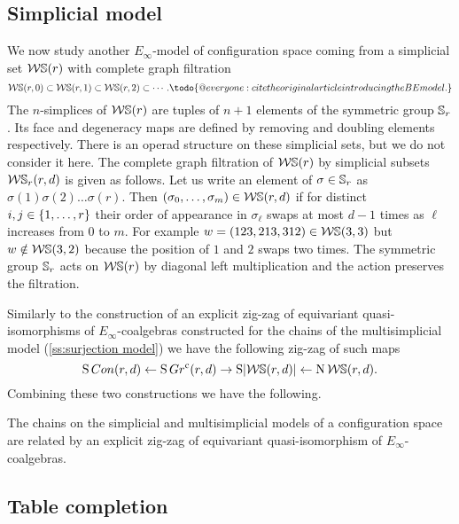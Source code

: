 \subsection{Simplicial model}\label{ss:simplicial model}

We now study another $E_\infty$-model of configuration space coming from a simplicial set $\mathcal{W}\mathbb{S}(r)$ with complete graph filtration
\[
\cW\sym(r,0) \subset \cW\sym(r,1) \subset \cW\sym(r,2) \subset \dotsb . \todo{@everyone: cite the original article introducing the BE model.}
\]
The $n$-simplices of $\mathcal{W}\mathbb{S}(r)$ are tuples of $n+1$ elements of the symmetric group $\mathbb{S}_r$.
Its face and degeneracy maps are defined by removing and doubling elements respectively.
There is an operad structure on these simplicial sets, but we do not consider it here.
The complete graph filtration of $\mathcal{W}\mathbb{S}(r)$ by simplicial subsets $\mathcal{W}\mathbb{S}_r(r,d)$ is given as follows.
Let us write an element of $\sigma \in \mathbb{S}_r$ as $\sigma(1) \sigma(2) \dots \sigma(r)$.
Then $(\sigma_0,\dots,\sigma_m) \in \mathcal{W}\mathbb{S}(r,d)$ if for distinct $i,j \in \{1,\dots,r\}$ their order of appearance in $\sigma_\ell$ swaps at most $d-1$ times as $\ell$ increases from $0$ to $m$.
For example $w = (123,213,312) \in \mathcal{W}\mathbb{S}(3,3)$ but $w \notin \mathcal{W}\mathbb{S}(3,2)$ because the position of $1$ and $2$ swaps two times.
The symmetric group $\mathbb{S}_r$ acts on $\mathcal{W}\mathbb{S}(r)$ by diagonal left multiplication and the action preserves the filtration.

Similarly to the construction of an explicit zig-zag of equivariant quasi-isomorphisms of $E_\infty$-coalgebras constructed for the chains of the multisimplicial model (\cref{ss:surjection model}) we have the following zig-zag of such maps
\[
\operatorname{S}Con(r,d) \leftarrow \operatorname{S} Gr^{\mathrm{c}}(r,d) \to \operatorname{S}\lvert\mathcal{W}\mathbb{S}(r,d)\rvert \leftarrow \operatorname{N} \mathcal{W}\mathbb{S}(r,d).
\]
Combining these two constructions we have the following.
\begin{theorem*}
	The chains on the simplicial and multisimplicial models of a configuration space are related by an explicit zig-zag of equivariant quasi-isomorphism of $E_\infty$-coalgebras.
\end{theorem*}

\subsection{Table completion}\label{ss:table completion}

